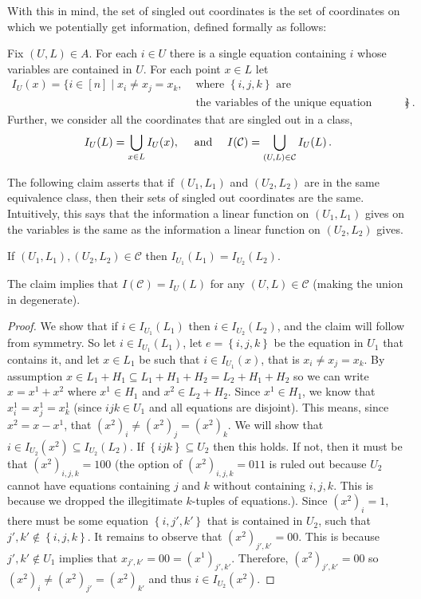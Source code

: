 \documentclass{toc}
\newcommand\set[1]{{\left\{ #1 \right\}}}
\renewcommand\subset{\subseteq}
\def\C{\mathcal{C}}
\begin{document}
With this in mind, the set of singled out coordinates is the set of coordinates on which we potentially get information, defined formally as follows:
%
\begin{definition}   %
Fix $(U,L) \in A$. For each $i\in U$ there is a single equation containing $i$ whose variables are contained in $U$.  For each point $x\in L$ let
%
%
%
%
\begin{align*}
I_U(x) = \{ i\in [n] \mid x_i \neq x_j=x_k, & \text{ where }\set{i,j,k}\text{ are } \\
    & \text{ the variables of the unique equation containing $i$} \}\,.
\end{align*}   %
Further, we consider all the coordinates that are singled out in a class,
\begin{equation}
  \label{eq:1}
I_U(L) = \bigcup_{x\in L}I_U(x), \quad \hbox{ and }\quad I(\C) = \bigcup_{(U,L)\in \C} I_U(L)\,.
\end{equation}
\end{definition}

The following claim asserts that if $(U_1,L_1)$ and $(U_2,L_2)$ are in the same equivalence class, then their sets of singled out coordinates
are the same. Intuitively, this says that the information a linear function on $(U_1,L_1)$ gives on the variables
is the same as the information a linear function on $(U_2,L_2)$ gives.
\begin{claim}\label{claim:singled}
If $(U_1,L_1),(U_2,L_2)\in\C$ then $I_{U_1}(L_1)=I_{U_2}(L_2)$.
\end{claim}
The claim implies that $I(\C) = I_U(L)$ for any $(U,L)\in \C$ (making
the union in  degenerate).
%
%
\begin{proof}
We  show that if $i \in I_{U_1}(L_1)$ then $i\in I_{U_2}(L_2)$, and the claim will follow from symmetry.
So let $i \in I_{U_1}(L_1)$, let $e=\set{i,j,k}$ be the equation in
$U_1$ that contains it, and let $x\in L_1$ be such that $i\in
I_{U_1}(x)$, that is  $x_i\neq x_j=x_k$. By assumption $x\in L_1 + H_1 \subset L_1 + H_1 + H_2 = L_2 + H_1 + H_2$ so we can write $x = x^1 + x^2$ where $x^1 \in H_1$ and $x^2 \in L_2+H_2$. Since $x^1\in H_1$, we know that $x^1_i=x^1_j=x^1_k$ (since $ijk \in U_1$ and all equations are disjoint). This means, since $x^2 = x - x^1$, that $(x^2)_i \neq (x^2)_j = (x^2)_k$. We will show that $i \in I_{U_2}(x^2) \subset I_{U_2}(L_2)$.
If $\set {ijk}\subset U_2$ then this holds. If not, then it must be
that $(x^2)_{i,j,k} = 100$ (the option of $(x^2)_{i,j,k} = 011$ is
ruled out because $U_2$ cannot have equations containing $j$ and $k$
without containing $i,j,k$. This is because we dropped the illegitimate $k$-tuples of equations.). Since $(x^2)_i=1$, there must be some
equation $\set{i,j',k'}$ that is contained in $U_2$, such that
$j',k'\not\in\set{i,j,k}$. It remains to observe that
$(x^2)_{j',k'}=00$. This is because $j',k'\not\in U_1$ implies that
$x_{j',k'}=00 = (x^1)_{j',k'}$. Therefore, $(x^2)_{j',k'}=00$ so
$(x^2)_i \neq (x^2)_{j'} = (x^2)_{k'}$  and thus $i\in I_{U_2}(x^2)$.
\end{proof}
\end{document}
